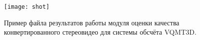 \begin{figure}[!h]
	\begin{minipage}[b]{1.0\linewidth}
		\centering
		\centerline{ \texttt{[image: shot]} }
	\end{minipage}
    \caption{Пример файла результатов работы модуля оценки качества 
    	конвертированного стереовидео для системы обсчёта VQMT3D.}
	\label{fig:system_example}
\end{figure}

